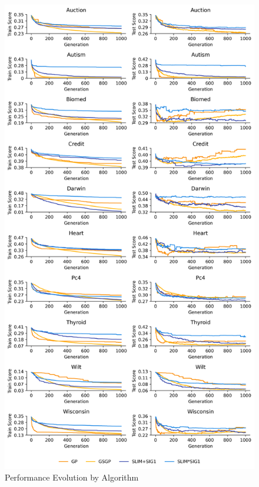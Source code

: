 
    \begin{figure}[h]
    \centering
    \includegraphics[width=\linewidth]{../Latex/Chapters/Figures/Results/comparison_performance_evolution.png}
    \caption{Performance Evolution by Algorithm}
    \label{fig:performance_evolution}
    \end{figure}
    